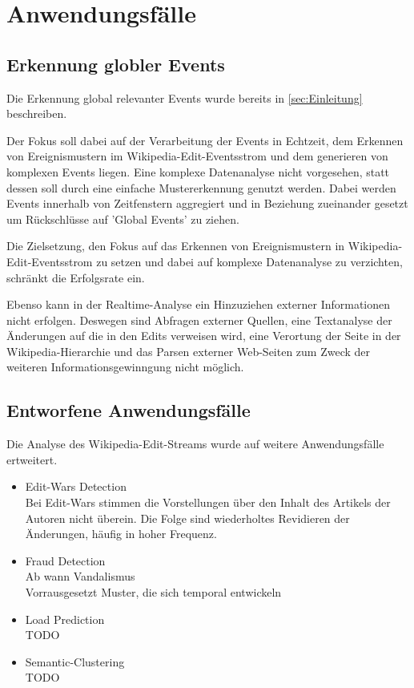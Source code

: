 \section{Anwendungsfälle}
\subsection{Erkennung globler Events}
Die Erkennung global relevanter Events wurde bereits in \ref{sec:Einleitung} beschreiben.

Der Fokus soll dabei auf der Verarbeitung der Events in Echtzeit, dem Erkennen von Ereignismustern im Wikipedia-Edit-Eventsstrom und dem generieren von komplexen Events liegen. Eine komplexe Datenanalyse nicht vorgesehen, statt dessen soll durch eine einfache Mustererkennung genutzt werden. Dabei werden Events innerhalb von Zeitfenstern aggregiert und in Beziehung zueinander gesetzt um Rückschlüsse auf 'Global Events' zu ziehen.

Die Zielsetzung, den Fokus auf das Erkennen von Ereignismustern in Wikipedia-Edit-Eventsstrom zu setzen und dabei auf komplexe Datenanalyse zu verzichten, schränkt die Erfolgsrate ein.

Ebenso kann in der Realtime-Analyse ein Hinzuziehen externer Informationen nicht erfolgen. Deswegen sind Abfragen externer Quellen, eine Textanalyse der Änderungen auf die in den Edits verweisen wird, eine Verortung der Seite in der Wikipedia-Hierarchie und das Parsen externer Web-Seiten zum Zweck der weiteren Informationsgewinngung nicht möglich. 



\subsection{Entworfene Anwendungsfälle}
Die Analyse des Wikipedia-Edit-Streams wurde auf weitere Anwendungsfälle ertweitert.

\begin{itemize}
    \item Edit-Wars Detection\\ Bei Edit-Wars stimmen die Vorstellungen über den Inhalt des Artikels der Autoren nicht überein. Die Folge sind wiederholtes Revidieren der Änderungen, häufig in hoher Frequenz.
    \item Fraud Detection\\Ab wann Vandalismus \\Vorrausgesetzt Muster, die sich temporal entwickeln
    \item Load Prediction\\ TODO
    \item Semantic-Clustering\\ TODO
\end{itemize}
